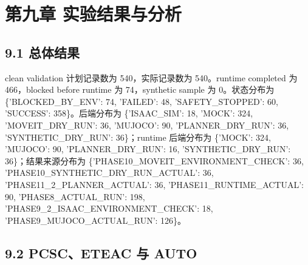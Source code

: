 \chapter{第九章 实验结果与分析}

\section{9.1 总体结果}

clean validation 计划记录数为 540，实际记录数为 540。runtime completed 为 466，blocked before runtime 为 74，synthetic sample 为 0。状态分布为 \{'BLOCKED\_BY\_ENV': 74, 'FAILED': 48, 'SAFETY\_STOPPED': 60, 'SUCCESS': 358\}。后端分布为 \{'ISAAC\_SIM': 18, 'MOCK': 324, 'MOVEIT\_DRY\_RUN': 36, 'MUJOCO': 90, 'PLANNER\_DRY\_RUN': 36, 'SYNTHETIC\_DRY\_RUN': 36\}；runtime 后端分布为 \{'MOCK': 324, 'MUJOCO': 90, 'PLANNER\_DRY\_RUN': 16, 'SYNTHETIC\_DRY\_RUN': 36\}；结果来源分布为 \{'PHASE10\_MOVEIT\_ENVIRONMENT\_CHECK': 36, 'PHASE10\_SYNTHETIC\_DRY\_RUN\_ACTUAL': 36, 'PHASE11\_2\_PLANNER\_ACTUAL': 36, 'PHASE11\_RUNTIME\_ACTUAL': 90, 'PHASE8\_ACTUAL\_RUN': 198, 'PHASE9\_2\_ISAAC\_ENVIRONMENT\_CHECK': 18, 'PHASE9\_MUJOCO\_ACTUAL\_RUN': 126\}。\par

\section{9.2 PCSC、ETEAC 与 AUTO}

